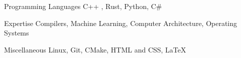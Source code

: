 
\begin{cvskills}

  \cvskill
    {Programming Languages}
    {C++ , Rust, Python, C\#}

  \cvskill
    {Expertise}
    {Compilers, Machine Learning, Computer Architecture, Operating Systems}

  \cvskill
    {Miscellaneous}
    {Linux, Git, CMake, HTML and CSS, \LaTeX}

\end{cvskills}
